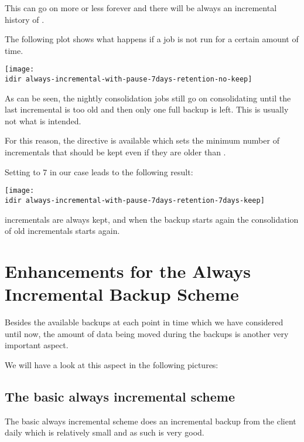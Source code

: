 This can go on more or less forever and there will be always an incremental history of .

The following plot shows what happens if a job is not run for a certain amount of time.

\begin{center}
\texttt{[image: \\idir always-incremental-with-pause-7days-retention-no-keep]}
\end{center}

As can be seen, the nightly consolidation jobs still go on consolidating until the last incremental is too old and then only one full backup is left. This is usually not what is intended.

For this reason, the directive  is available which sets the minimum number of incrementals that should be kept even if they are older than .

Setting  to 7 in our case leads to the following result:

\begin{center}
\texttt{[image: \\idir always-incremental-with-pause-7days-retention-7days-keep]}
\end{center}

 incrementals are always kept, and when the backup starts again the consolidation of old incrementals starts again.


\section{Enhancements for the Always Incremental Backup Scheme}

Besides the available backups at each point in time which we have considered until now, the amount of data being moved during the backups is another very important aspect.

We will have a look at this aspect in the following pictures:


\subsection{The basic always incremental scheme}

The basic always incremental scheme does an incremental backup from the client daily which is relatively small and as such is very good.

